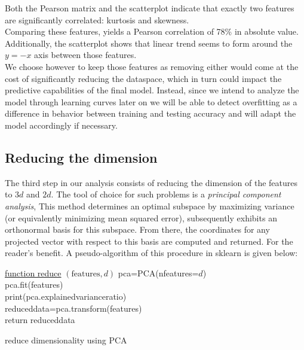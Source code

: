 \documentclass[14pt]{article}
\theoremstyle{plain}
\theoremstyle{definition}
\newcommand{\un}{\textunderscore}
\begin{document}
 \noindent Both the Pearson matrix and the scatterplot indicate that exactly two features are significantly correlated: kurtosis and skewness.\\ Comparing these features, yields a Pearson correlation of 78\% in absolute value. Additionally, the scatterplot shows that linear trend seems to form around the $y=-x$ axis between those features.\\ 
 We choose however to keep those features as removing either would come  at the cost of significantly reducing the dataspace,  which in turn could impact the predictive capabilities of the final model. Instead, since we intend to analyze the model through learning curves later on we will be able to detect overfitting as a difference in behavior between training and testing accuracy and will adapt the model accordingly if necessary. 

\subsection{Reducing the dimension} The third step in our analysis consists of reducing the dimension of the features to $3d$ and $2d$. The tool of choice for such problems is a \emph{principal component analysis}, This method determines an optimal subspace by maximizing variance (or equivalently minimizing mean squared error), subsequently exhibits an orthonormal basis for this subspace. From there, the coordinates for any projected vector with respect to this basis are computed and returned. For the reader's benefit. A pseudo-algorithm of this procedure in sklearn is given below: 
\begin{algorithm}\label{PCAalg}

    \underline{function reduce} $(\textrm{features}, d)$\;
    pca=PCA(n\textunderscore features=$d$) \\
  	pca.fit(features)\\
    print(pca.explained\textunderscore variance\textunderscore ratio\textunderscore)	\\
   reduced\textunderscore data=pca.transform(features)\\
   return reduced\un data      
   \caption{reduce dimensionality using PCA }
\end{algorithm}
\end{document}
